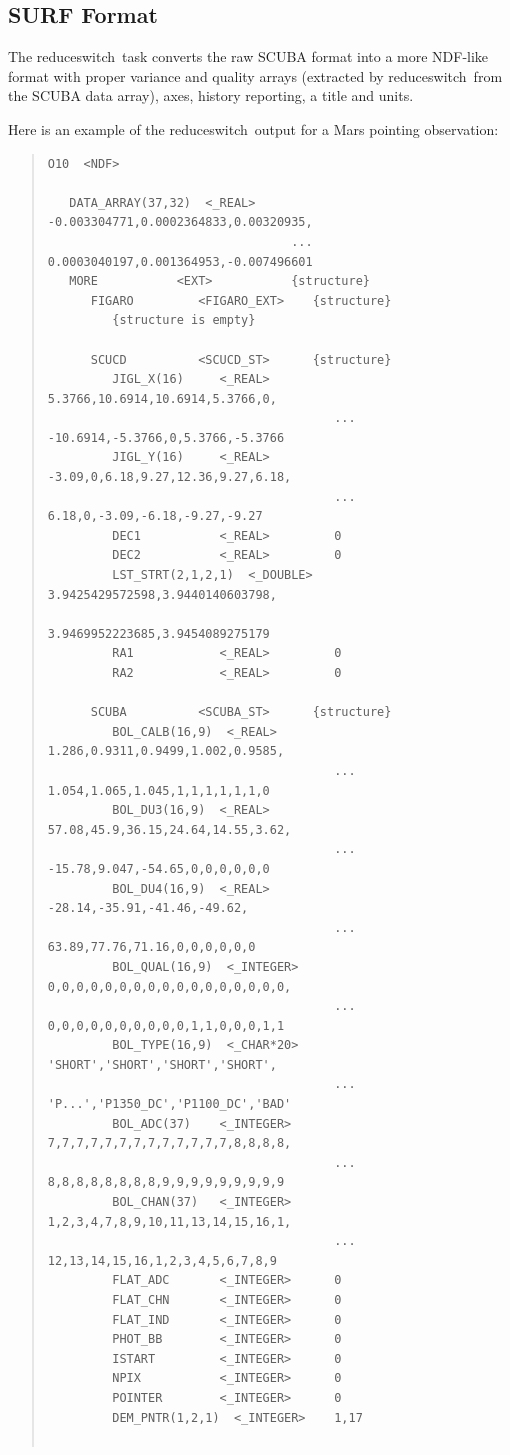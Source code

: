 \documentclass[twoside,11pt]{article}
\newenvironment{myquote}{\begin{quote}\begin{small}}{\end{small}\end{quote}}
\newcommand{\task}[1]{{\sf #1}}
\newcommand{\resw}{\xref{\task{reduce\_switch}}{sun216}{REDUCE_SWITCH}}
\newcommand{\xref}[3]{#1}
\renewcommand{\_}{\texttt{\symbol{95}}}
\begin{document}
\subsection{SURF Format\label{sec:surfform}}

The \resw\ task converts the raw SCUBA format into a more NDF-like format
with proper variance and quality arrays (extracted by \resw\ from the SCUBA
data array), axes, history reporting, a title and units.

Here is an example of the \resw\ output for a Mars pointing observation:

\begin{myquote}
\begin{verbatim}
O10  <NDF>

   DATA_ARRAY(37,32)  <_REAL>     -0.003304771,0.0002364833,0.00320935,
                                  ... 0.0003040197,0.001364953,-0.007496601
   MORE           <EXT>           {structure}
      FIGARO         <FIGARO_EXT>    {structure}
         {structure is empty}

      SCUCD          <SCUCD_ST>      {structure}
         JIGL_X(16)     <_REAL>         5.3766,10.6914,10.6914,5.3766,0,
                                        ... -10.6914,-5.3766,0,5.3766,-5.3766
         JIGL_Y(16)     <_REAL>         -3.09,0,6.18,9.27,12.36,9.27,6.18,
                                        ... 6.18,0,-3.09,-6.18,-9.27,-9.27
         DEC1           <_REAL>         0
         DEC2           <_REAL>         0
         LST_STRT(2,1,2,1)  <_DOUBLE>   3.9425429572598,3.9440140603798,
                                        3.9469952223685,3.9454089275179
         RA1            <_REAL>         0
         RA2            <_REAL>         0

      SCUBA          <SCUBA_ST>      {structure}
         BOL_CALB(16,9)  <_REAL>        1.286,0.9311,0.9499,1.002,0.9585,
                                        ... 1.054,1.065,1.045,1,1,1,1,1,1,0
         BOL_DU3(16,9)  <_REAL>         57.08,45.9,36.15,24.64,14.55,3.62,
                                        ... -15.78,9.047,-54.65,0,0,0,0,0,0
         BOL_DU4(16,9)  <_REAL>         -28.14,-35.91,-41.46,-49.62,
                                        ... 63.89,77.76,71.16,0,0,0,0,0,0
         BOL_QUAL(16,9)  <_INTEGER>     0,0,0,0,0,0,0,0,0,0,0,0,0,0,0,0,0,
                                        ... 0,0,0,0,0,0,0,0,0,0,1,1,0,0,0,1,1
         BOL_TYPE(16,9)  <_CHAR*20>     'SHORT','SHORT','SHORT','SHORT',
                                        ... 'P...','P1350_DC','P1100_DC','BAD'
         BOL_ADC(37)    <_INTEGER>      7,7,7,7,7,7,7,7,7,7,7,7,7,8,8,8,8,
                                        ... 8,8,8,8,8,8,8,8,9,9,9,9,9,9,9,9,9
         BOL_CHAN(37)   <_INTEGER>      1,2,3,4,7,8,9,10,11,13,14,15,16,1,
                                        ... 12,13,14,15,16,1,2,3,4,5,6,7,8,9
         FLAT_ADC       <_INTEGER>      0
         FLAT_CHN       <_INTEGER>      0
         FLAT_IND       <_INTEGER>      0
         PHOT_BB        <_INTEGER>      0
         ISTART         <_INTEGER>      0
         NPIX           <_INTEGER>      0
         POINTER        <_INTEGER>      0
         DEM_PNTR(1,2,1)  <_INTEGER>    1,17


\end{verbatim}
\end{myquote}
\end{document}

